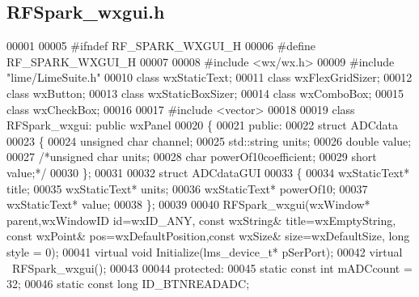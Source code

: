 \subsection{R\+F\+Spark\+\_\+wxgui.\+h}
\label{RFSpark__wxgui_8h_source}

\begin{DoxyCode}
00001 
00005 \textcolor{preprocessor}{#ifndef RF\_SPARK\_WXGUI\_H}
00006 \textcolor{preprocessor}{#define RF\_SPARK\_WXGUI\_H}
00007 
00008 \textcolor{preprocessor}{#include <wx/wx.h>}
00009 \textcolor{preprocessor}{#include "lime/LimeSuite.h"}
00010 \textcolor{keyword}{class }wxStaticText;
00011 \textcolor{keyword}{class }wxFlexGridSizer;
00012 \textcolor{keyword}{class }wxButton;
00013 \textcolor{keyword}{class }wxStaticBoxSizer;
00014 \textcolor{keyword}{class }wxComboBox;
00015 \textcolor{keyword}{class }wxCheckBox;
00016 
00017 \textcolor{preprocessor}{#include <vector>}
00018 
00019 \textcolor{keyword}{class }RFSpark_wxgui: \textcolor{keyword}{public} wxPanel
00020 \{
00021 \textcolor{keyword}{public}:
00022     \textcolor{keyword}{struct }ADCdata
00023     \{
00024         \textcolor{keywordtype}{unsigned} \textcolor{keywordtype}{char} channel;
00025         std::string units;
00026         \textcolor{keywordtype}{double} value;
00027         \textcolor{comment}{/*unsigned char units;}
00028 \textcolor{comment}{        char powerOf10coefficient;}
00029 \textcolor{comment}{        short value;*/}
00030     \};
00031 
00032     \textcolor{keyword}{struct }ADCdataGUI
00033     \{
00034         wxStaticText* title;
00035         wxStaticText* units;
00036         wxStaticText* powerOf10;
00037         wxStaticText* value;
00038     \};
00039 
00040     RFSpark_wxgui(wxWindow* parent,wxWindowID \textcolor{keywordtype}{id}=wxID\_ANY, \textcolor{keyword}{const} wxString& title=wxEmptyString, \textcolor{keyword}{const} 
      wxPoint& pos=wxDefaultPosition,\textcolor{keyword}{const} wxSize& size=wxDefaultSize, \textcolor{keywordtype}{long} style = 0);
00041     \textcolor{keyword}{virtual} \textcolor{keywordtype}{void} Initialize(lms_device_t* pSerPort);
00042     \textcolor{keyword}{virtual} ~RFSpark_wxgui();
00043 
00044 \textcolor{keyword}{protected}:
00045     \textcolor{keyword}{static} \textcolor{keyword}{const} \textcolor{keywordtype}{int} mADCcount = 32;
00046     \textcolor{keyword}{static} \textcolor{keyword}{const} \textcolor{keywordtype}{long} ID_BTNREADADC;

\end{DoxyCode}

